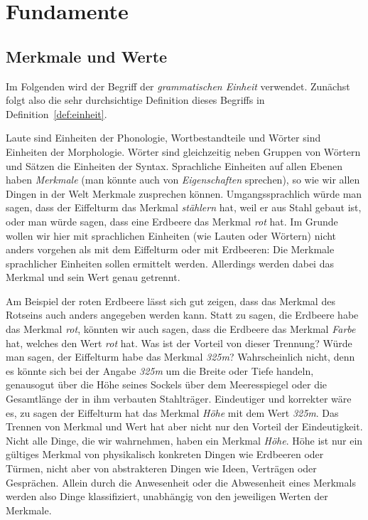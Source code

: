\chapter{Fundamente}
\label{sec:grundbegriffedergrammatik}

\section{Merkmale und Werte}
\label{sec:merkmaleundwerte}

Im Folgenden wird der Begriff der \textit{grammatischen Einheit} verwendet.
Zunächst folgt also die sehr durchsichtige Definition dieses Begriffs in Definition~\ref{def:einheit}.



Laute sind Einheiten der Phonologie, Wortbestandteile und Wörter sind Einheiten der Morphologie.
Wörter sind gleichzeitig neben Gruppen von Wörtern und Sätzen die Einheiten der Syntax.
Sprachliche Einheiten auf allen Ebenen haben \textit{Merkmale} (man könnte auch von \textit{Eigenschaften} sprechen), so wie wir allen Dingen in der Welt Merkmale zusprechen können.
Umgangssprachlich würde man sagen, dass der Eiffelturm das Merkmal \textit{stählern} hat, weil er aus Stahl gebaut ist, oder man würde sagen, dass eine Erdbeere das Merkmal \textit{rot} hat.
Im Grunde wollen wir hier mit sprachlichen Einheiten (wie Lauten oder Wörtern) nicht anders vorgehen als mit dem Eiffelturm oder mit Erdbeeren:
Die Merkmale sprachlicher Einheiten sollen ermittelt werden.
Allerdings werden dabei das Merkmal und sein Wert genau getrennt.


Am Beispiel der roten Erdbeere lässt sich gut zeigen, dass das Merkmal des Rotseins auch anders angegeben werden kann.
Statt zu sagen, die Erdbeere habe das Merkmal \textit{rot}, könnten wir auch sagen, dass die Erdbeere das Merkmal \textit{Farbe} hat, welches den Wert \textit{rot} hat.
Was ist der Vorteil von dieser Trennung?
Würde man sagen, der Eiffelturm habe das Merkmal \textit{325m}?
Wahrscheinlich nicht, denn es könnte sich bei der Angabe \textit{325m} um die Breite oder Tiefe handeln, genausogut über die Höhe seines Sockels über dem Meeresspiegel oder die Gesamtlänge der in ihm verbauten Stahlträger.
Eindeutiger und korrekter wäre es, zu sagen der Eiffelturm hat das Merkmal \textit{Höhe} mit dem Wert \textit{325m}.
Das Trennen von Merkmal und Wert hat aber nicht nur den Vorteil der Eindeutigkeit.
Nicht alle Dinge, die wir wahrnehmen, haben ein Merkmal \textit{Höhe}.
Höhe ist nur ein gültiges Merkmal von physikalisch konkreten Dingen wie Erdbeeren oder Türmen, nicht aber von abstrakteren Dingen wie Ideen, Verträgen oder Gesprächen.
Allein durch die Anwesenheit oder die Abwesenheit eines Merkmals werden also Dinge klassifiziert, unabhängig von den jeweiligen Werten der Merkmale.

